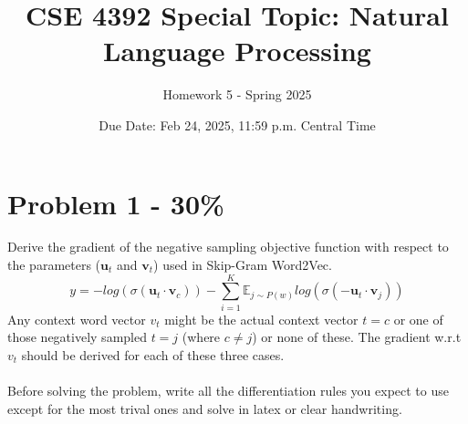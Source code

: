 \documentclass{article}
\newcommand{\answerboxbig}{
    \vspace{20cm} %
}
\begin{document}
\title{CSE 4392 Special Topic: Natural Language Processing}
\author{Homework 5 - Spring 2025}
\date{Due Date: Feb 24, 2025, 11:59 p.m. Central Time}
\maketitle
\thispagestyle{fancy}



\section*{Problem 1 - 30\%}
Derive the gradient of the negative sampling objective function with respect to the parameters ($\mathbf{u}_t$ and $\mathbf{v}_t$) used in Skip-Gram Word2Vec.
$$y=-log(\sigma(\mathbf{u}_t \cdot \mathbf{v}_c)) - \sum_{i=1}^{K}\mathbb{E}_{j\sim P(w)}log(\sigma(-\mathbf{u}_t \cdot \mathbf{v}_j))$$
Any context word vector $v_t$ might be the actual context vector $t=c$ or one of those negatively sampled $t=j$ (where $c \neq j$) or none of these. The gradient w.r.t $v_t$ should be derived for each of these three cases.
\\ \\
Before solving the problem, write all the differentiation rules you expect to use except for the most trival ones and solve in latex or clear handwriting.

\answerboxbig
\end{document}
